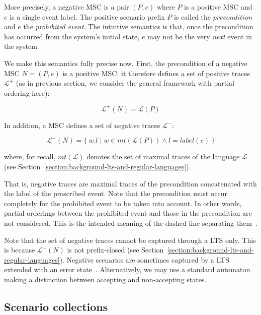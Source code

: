 More precisely, a negative MSC is a pair $(P,e)$ where $P$ is a positive MSC and $e$ is a single event label. The positive scenario prefix $P$ is called the $precondition$ and $e$ the \emph{prohibited event}. The intuitive semantics is that, once the precondition has occurred from the system's initial state, $e$ may not be the very \emph{next} event in the system. 

We make this semantics fully precise now. First, the precondition of a negative MSC $N = (P,e)$ is a positive MSC; it therefore defines a set of positive traces $\mathcal{L}^{+}$ (as in previous section, we consider the general framework with partial ordering here):

\vspace{-0.2cm}
\begin{equation}
\mathcal{L}^{+}(N) = \mathcal{L}(P)
\end{equation}

\noindent In addition, a MSC defines a set of negative traces $\mathcal{L}^{-}$:

\vspace{-0.2cm}
\begin{equation}
\mathcal{L}^{-}(N) = \{~w.l \mid w \in mt(\mathcal{L}(P)) \wedge l = label(e)~\}
\end{equation}

\noindent where, for recall, $mt(\mathcal{L})$ denotes the set of maximal traces of the language $\mathcal{L}$ (see Section~\ref{section:background-lts-and-regular-languages}).

That is, negative traces are maximal traces of the precondition concatenated with the label of the proscribed event. Note that the precondition must occur completely for the prohibited event to be taken into account. In other words, partial orderings between the prohibited event and those in the precondition are not considered. This is the intended meaning of the dashed line separating them~\cite{Uchitel:2004}. 

Note that the set of negative traces cannot be captured through a LTS only. This is because $\mathcal{L}^{-}(N)$ is not prefix-closed (see Section~\ref{section:background-lts-and-regular-languages}). Negative scenarios are sometimes captured by a LTS extended with an error state~\cite{Uchitel:2004}. Alternatively, we may use a standard automaton making a distinction between accepting and non-accepting states. 

\subsection{Scenario collections\label{subsection:background-scenario-collections}}


